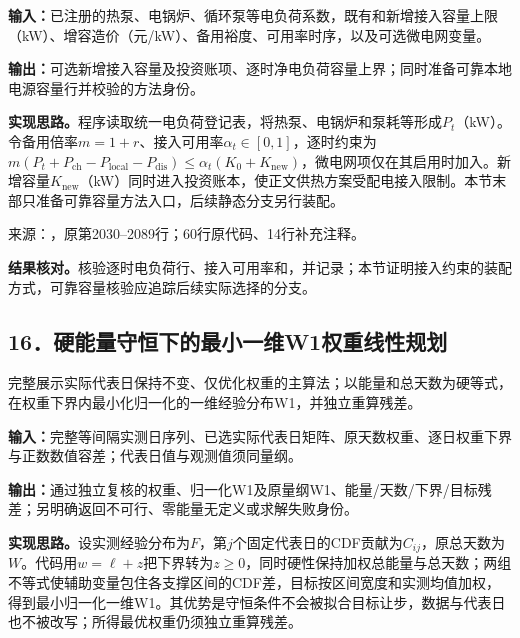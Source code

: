 \noindent\textbf{输入：}已注册的热泵、电锅炉、循环泵等电负荷系数，既有和新增接入容量上限（kW）、增容造价（元/kW）、备用裕度、可用率时序，以及可选微电网变量。\par
\noindent\textbf{输出：}可选新增接入容量及投资账项、逐时净电负荷容量上界；同时准备可靠本地电源容量行并校验的方法身份。\par

\noindent\textbf{实现思路。}程序读取统一电负荷登记表，将热泵、电锅炉和泵耗等形成$P_t$（kW）。令备用倍率$m=1+r$、接入可用率$\alpha_t\in[0,1]$，逐时约束为$m(P_t+P_{\mathrm{ch}}-P_{\mathrm{local}}-P_{\mathrm{dis}})\le\alpha_t(K_0+K_{\mathrm{new}})$，微电网项仅在其启用时加入。新增容量$K_{\mathrm{new}}$（kW）同时进入投资账本，使正文供热方案受配电接入限制。本节末部只准备可靠容量方法入口，后续静态分支另行装配。

{\small 来源：，原第2030--2089行；60行原代码、14行补充注释。}\par

\begingroup
{}

\endgroup

\noindent\textbf{结果核对。}核验逐时电负荷行、接入可用率和，并记录；本节证明接入约束的装配方式，可靠容量核验应追踪后续实际选择的分支。

\subsection*{16．硬能量守恒下的最小一维W1权重线性规划}
完整展示实际代表日保持不变、仅优化权重的主算法；以能量和总天数为硬等式，在权重下界内最小化归一化的一维经验分布W1，并独立重算残差。

\noindent\textbf{输入：}完整等间隔实测日序列、已选实际代表日矩阵、原天数权重、逐日权重下界与正数数值容差；代表日值与观测值须同量纲。\par
\noindent\textbf{输出：}通过独立复核的权重、归一化W1及原量纲W1、能量/天数/下界/目标残差；另明确返回不可行、零能量无定义或求解失败身份。\par

\noindent\textbf{实现思路。}设实测经验分布为$F$，第$j$个固定代表日的CDF贡献为$C_{ij}$，原总天数为$W$。代码用$w=\ell+z$把下界转为$z\ge0$，同时硬性保持加权总能量与总天数；两组不等式使辅助变量包住各支撑区间的CDF差，目标按区间宽度和实测均值加权，得到最小归一化一维W1。其优势是守恒条件不会被拟合目标让步，数据与代表日也不被改写；所得最优权重仍须独立重算残差。

